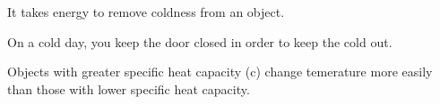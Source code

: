 \documentclass[10pt]{examdesign}
\begin{document}
\begin{truefalse}[title={True or False},
	rearrange=yes]
\begin{question}
	 It takes energy to remove coldness from an object.  
\end{question}

\begin{question}
	 On a cold day, you keep the door closed in order to keep the cold out.
\end{question}
	
\begin{question}
 Objects with greater specific heat capacity (c) change temerature more easily than those with lower specific heat capacity.  
\end{question}






\end{truefalse}
\end{document}
